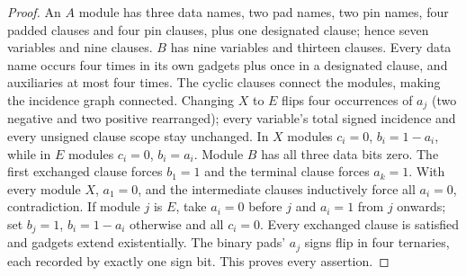 \documentclass[11pt]{article}
\begin{document}
\begin{proof}
An $A$ module has three data names, two pad names, two pin names, four padded clauses and four pin clauses, plus one designated clause; hence seven variables and nine clauses. $B$ has nine variables and thirteen clauses. Every data name occurs four times in its own gadgets plus once in a designated clause, and auxiliaries at most four times. The cyclic clauses connect the modules, making the incidence graph connected. Changing $X$ to $E$ flips four occurrences of $a_j$ (two negative and two positive rearranged); every variable's total signed incidence and every unsigned clause scope stay unchanged.
In $X$ modules $c_i=0$, $b_i=1-a_i$, while in $E$ modules $c_i=0$, $b_i=a_i$. Module $B$ has all three data bits zero. The first exchanged clause forces $b_1=1$ and the terminal clause forces $a_k=1$. With every module $X$, $a_1=0$, and the intermediate clauses inductively force all $a_i=0$, contradiction. If module $j$ is $E$, take $a_i=0$ before $j$ and $a_i=1$ from $j$ onwards; set $b_j=1$, $b_i=1-a_i$ otherwise and all $c_i=0$. Every exchanged clause is satisfied and gadgets extend existentially. The binary pads' $a_j$ signs flip in four ternaries, each recorded by exactly one sign bit. This proves every assertion.
\end{proof}
\end{document}
